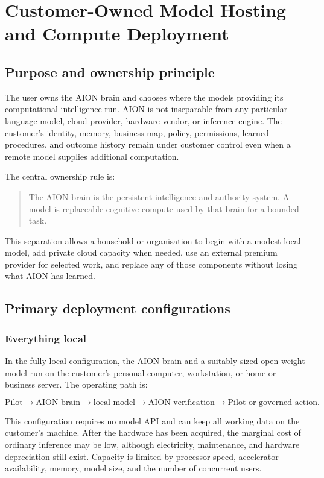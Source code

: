 \section{Customer-Owned Model Hosting and Compute Deployment}
\label{sec:aion-model-hosting-compute-deployment}

\subsection{Purpose and ownership principle}

The user owns the AION brain and chooses where the models providing its
computational intelligence run.  AION is not inseparable from any particular
language model, cloud provider, hardware vendor, or inference engine.  The
customer's identity, memory, business map, policy, permissions, learned
procedures, and outcome history remain under customer control even when a
remote model supplies additional computation.

The central ownership rule is:

\begin{quote}
The AION brain is the persistent intelligence and authority system.  A model is
replaceable cognitive compute used by that brain for a bounded task.
\end{quote}

This separation allows a household or organisation to begin with a modest local
model, add private cloud capacity when needed, use an external premium provider
for selected work, and replace any of those components without losing what AION
has learned.

\subsection{Primary deployment configurations}

\subsubsection{Everything local}

In the fully local configuration, the AION brain and a suitably sized
open-weight model run on the customer's personal computer, workstation, or home
or business server.  The operating path is:

\[
\text{Pilot}
\rightarrow \text{AION brain}
\rightarrow \text{local model}
\rightarrow \text{AION verification}
\rightarrow \text{Pilot or governed action}.
\]

This configuration requires no model API and can keep all working data on the
customer's machine.  After the hardware has been acquired, the marginal cost of
ordinary inference may be low, although electricity, maintenance, and hardware
depreciation still exist.  Capacity is limited by processor speed, accelerator
availability, memory, model size, and the number of concurrent users.

